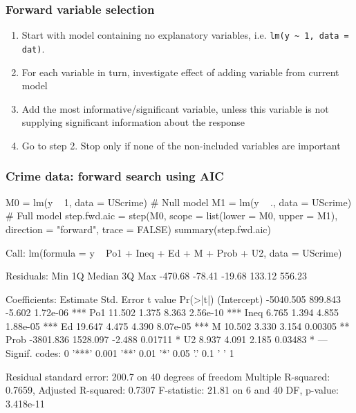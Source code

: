 \documentclass[a4paper]{article}\usepackage[]{graphicx}\usepackage[]{xcolor}
\begin{document}
\subsubsection{Forward variable selection}
\begin{enumerate}
	\item Start with model containing no explanatory variables, i.e. \lstinline|lm(y ~ 1, data = dat)|.
	\item For each variable in turn, investigate effect of adding variable from current model
	\item \textcolor{myred}{Add the most informative/significant variable}, unless this variable is not supplying significant information about the response
	\item Go to step 2. Stop only if none of the non-included variables are important
\end{enumerate}
\subsubsection{Crime data: forward search using AIC}
\begin{Schunk}
\begin{Sinput}
M0 = lm(y ~ 1, data = UScrime)  # Null model
M1 = lm(y ~ ., data = UScrime)  # Full model
step.fwd.aic = step(M0, scope = list(lower = M0, upper = M1),
                    direction = "forward", trace = FALSE)
summary(step.fwd.aic)
\end{Sinput}
\begin{Soutput}

Call:
lm(formula = y ~ Po1 + Ineq + Ed + M + Prob + U2, data = UScrime)

Residuals:
    Min      1Q  Median      3Q     Max 
-470.68  -78.41  -19.68  133.12  556.23 

Coefficients:
             Estimate Std. Error t value Pr(>|t|)    
(Intercept) -5040.505    899.843  -5.602 1.72e-06 ***
Po1            11.502      1.375   8.363 2.56e-10 ***
Ineq            6.765      1.394   4.855 1.88e-05 ***
Ed             19.647      4.475   4.390 8.07e-05 ***
M              10.502      3.330   3.154  0.00305 ** 
Prob        -3801.836   1528.097  -2.488  0.01711 *  
U2              8.937      4.091   2.185  0.03483 *  
---
Signif. codes:  0 '***' 0.001 '**' 0.01 '*' 0.05 '.' 0.1 ' ' 1

Residual standard error: 200.7 on 40 degrees of freedom
Multiple R-squared:  0.7659,	Adjusted R-squared:  0.7307 
F-statistic: 21.81 on 6 and 40 DF,  p-value: 3.418e-11
\end{Soutput}
\end{Schunk}
\end{document}
